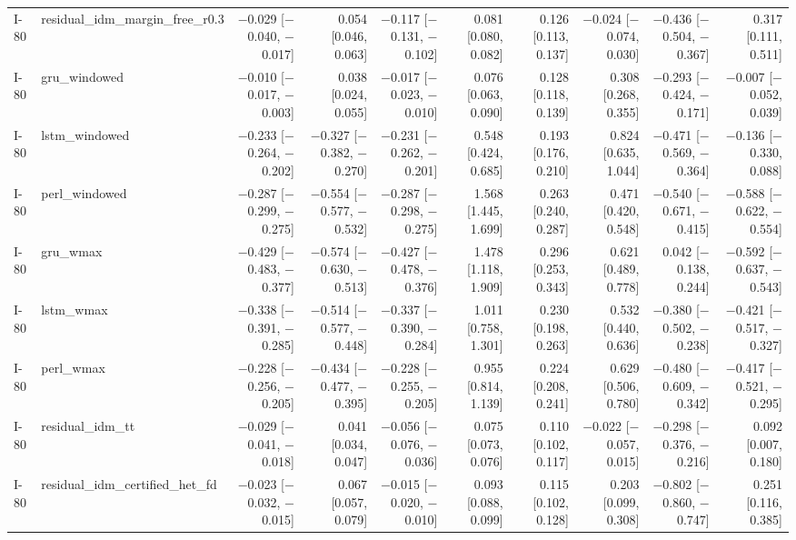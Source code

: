 \begin{table}[htbp]
{\begin{tabular}{llrrrrrrrr}
I-80 & residual\_idm\_margin\_free\_r0.3 & $-$0.029 [$-$0.040, $-$0.017] & 0.054 [0.046, 0.063] & $-$0.117 [$-$0.131, $-$0.102] & 0.081 [0.080, 0.082] & 0.126 [0.113, 0.137] & $-$0.024 [$-$0.074, 0.030] & $-$0.436 [$-$0.504, $-$0.367] & 0.317 [0.111, 0.511] \\
I-80 & gru\_windowed & $-$0.010 [$-$0.017, $-$0.003] & 0.038 [0.024, 0.055] & $-$0.017 [$-$0.023, $-$0.010] & 0.076 [0.063, 0.090] & 0.128 [0.118, 0.139] & 0.308 [0.268, 0.355] & $-$0.293 [$-$0.424, $-$0.171] & $-$0.007 [$-$0.052, 0.039] \\
I-80 & lstm\_windowed & $-$0.233 [$-$0.264, $-$0.202] & $-$0.327 [$-$0.382, $-$0.270] & $-$0.231 [$-$0.262, $-$0.201] & 0.548 [0.424, 0.685] & 0.193 [0.176, 0.210] & 0.824 [0.635, 1.044] & $-$0.471 [$-$0.569, $-$0.364] & $-$0.136 [$-$0.330, 0.088] \\
I-80 & perl\_windowed & $-$0.287 [$-$0.299, $-$0.275] & $-$0.554 [$-$0.577, $-$0.532] & $-$0.287 [$-$0.298, $-$0.275] & 1.568 [1.445, 1.699] & 0.263 [0.240, 0.287] & 0.471 [0.420, 0.548] & $-$0.540 [$-$0.671, $-$0.415] & $-$0.588 [$-$0.622, $-$0.554] \\
I-80 & gru\_wmax & $-$0.429 [$-$0.483, $-$0.377] & $-$0.574 [$-$0.630, $-$0.513] & $-$0.427 [$-$0.478, $-$0.376] & 1.478 [1.118, 1.909] & 0.296 [0.253, 0.343] & 0.621 [0.489, 0.778] & 0.042 [$-$0.138, 0.244] & $-$0.592 [$-$0.637, $-$0.543] \\
I-80 & lstm\_wmax & $-$0.338 [$-$0.391, $-$0.285] & $-$0.514 [$-$0.577, $-$0.448] & $-$0.337 [$-$0.390, $-$0.284] & 1.011 [0.758, 1.301] & 0.230 [0.198, 0.263] & 0.532 [0.440, 0.636] & $-$0.380 [$-$0.502, $-$0.238] & $-$0.421 [$-$0.517, $-$0.327] \\
I-80 & perl\_wmax & $-$0.228 [$-$0.256, $-$0.205] & $-$0.434 [$-$0.477, $-$0.395] & $-$0.228 [$-$0.255, $-$0.205] & 0.955 [0.814, 1.139] & 0.224 [0.208, 0.241] & 0.629 [0.506, 0.780] & $-$0.480 [$-$0.609, $-$0.342] & $-$0.417 [$-$0.521, $-$0.295] \\
I-80 & residual\_idm\_tt & $-$0.029 [$-$0.041, $-$0.018] & 0.041 [0.034, 0.047] & $-$0.056 [$-$0.076, $-$0.036] & 0.075 [0.073, 0.076] & 0.110 [0.102, 0.117] & $-$0.022 [$-$0.057, 0.015] & $-$0.298 [$-$0.376, $-$0.216] & 0.092 [0.007, 0.180] \\
I-80 & residual\_idm\_certified\_het\_fd & $-$0.023 [$-$0.032, $-$0.015] & 0.067 [0.057, 0.079] & $-$0.015 [$-$0.020, $-$0.010] & 0.093 [0.088, 0.099] & 0.115 [0.102, 0.128] & 0.203 [0.099, 0.308] & $-$0.802 [$-$0.860, $-$0.747] & 0.251 [0.116, 0.385] \\

\end{tabular}}
\end{table}
